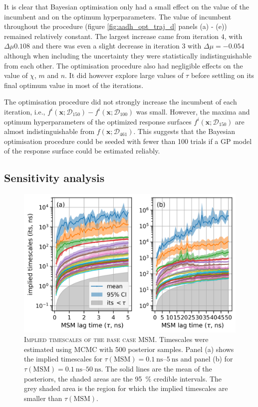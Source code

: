 It is clear that Bayesian optimisation only had a small effect on the value of the incumbent and on the optimum hyperparameters.  The value of incumbent throughout the procedure (figure \ref{fig:aadh_opt_traj_d} panels (a) - (e)) remained relatively constant. The largest increase came from iteration $4$, with $\Delta \mu 0.108$ and there was even a slight decrease in iteration $3$ with $\Delta \mu = -0.054$ although when including the uncertainty they were statistically indistinguishable from each other. The optimisation procedure also had negligible effects on the value of $\chi$, $m$ and $n$. It did however explore large values of  $\tau$ before settling on its final optimum value in most of the iterations.

The optimisation procedure did not strongly increase the incumbent of each iteration, i.e.,  $f^{i}(\mathbf{x};\mathcal{D}_{150})-f^{i}(\mathbf{x};\mathcal{D}_{100})$ was small. However, the maxima and optimum hyperparameters of the optimized response surfaces $f^{i}\left(\mathbf{x};\mathcal{D}_{150}\right)$ are almost indistinguishable from $f\left(\mathbf{x};\mathcal{D}_{461}\right)$. This suggests that the Bayesian optimisation procedure could be seeded with fewer than \num{100} trials if a GP model of the response surface could be estimated reliably. 

\subsection{Sensitivity analysis}\label{sec:aadh_sens_analysis}

\begin{figure}
    \centering
    \caption[Implied timescales of the base case MSM]{\textsc{Implied timescales of the base case MSM}. Timescales were estimated using MCMC with \num{500} posterior samples. Panel (a) shows the implied timescales for $\tau(\mathrm{MSM}) = \SIrange[range-phrase=--]{0.1}{5}{\nano\second}$  and panel (b) for $\tau(\mathrm{MSM}) = \SIrange[range-phrase=--]{0.1}{50}{\nano\second}$. The solid lines are the mean of the posteriors, the shaded areas are the  \SI{95}{\percent} credible intervals. The grey shaded area is the region for which the implied timescales are smaller than $\tau(\mathrm{MSM})$.}\label{fig:aadh_its}
    \includegraphics[width=0.8\linewidth]{chapters/msm_optimization/figures/aadh_implied_timescales.png}
\end{figure}

